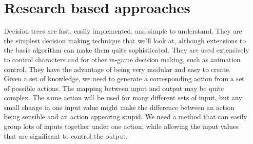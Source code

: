 \section{Research based approaches}
Decision trees are fast, easily implemented, and simple to understand. They are the simplest
decision making technique that we’ll look at, although extensions to the basic algorithm can make
them quite sophisticated. They are used extensively to control characters and for other in-game
decision making, such as animation control.
They have the advantage of being very modular and easy to create.
Given a set of knowledge, we need to generate a corresponding action from a set of possible
actions.
The mapping between input and output may be quite complex. The same action will be used
for many different sets of input, but any small change in one input value might make the difference
between an action being sensible and an action appearing stupid.
We need a method that can easily group lots of inputs together under one action, while
allowing the input values that are significant to control the output.